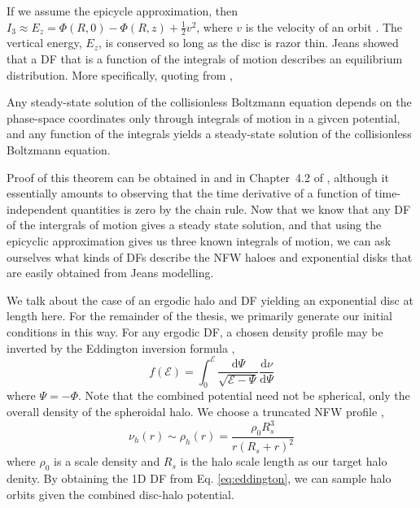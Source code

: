 If we assume the epicycle approximation, then $I_3 \approx E_z = \Phi(R,0) - \Phi(R,z) + \frac{1}{2} v^2$, where $v$ is the velocity of an orbit \citep{kd95galactics}. The vertical energy, $E_z$, is conserved so long as the disc is razor thin. Jeans showed that a DF that is a function of the integrals of motion describes an equilibrium distribution. More specifically, quoting from \citet{BT},
\begin{theorem}
Any steady-state solution of the collisionless Boltzmann equation depends on the phase-space coordinates only through integrals of motion in a givcen potential, and any function of the integrals yields a steady-state solution of the collisionless Boltzmann equation.
\end{theorem}
Proof of this theorem can be obtained in \citet{jeans_1915} and in Chapter~4.2 of \citet{BT}, although it essentially amounts to observing that the time derivative of a function of time-independent quantities is zero by the chain rule. Now that we know that any DF of the intergrals of motion gives a steady state solution, and that using the epicyclic approximation gives us three known integrals of motion, we can ask ourselves what kinds of DFs describe the NFW haloes and exponential disks that are easily obtained from Jeans modelling.

We talk about the case of an ergodic halo and DF yielding an exponential disc at length here. For the remainder of the thesis, we primarily generate our initial conditions in this way. For any ergodic DF, a chosen density profile may be inverted by the Eddington inversion formula \citep{BT},
\begin{equation}
f(\mathcal{E}) = \int_0^{\mathcal{E}} \frac{\text{d} \Psi}{\sqrt{\mathcal{E} - \Psi}} \frac{\text{d} \nu}{\text{d} \Psi} \label{eq:eddington}
\end{equation}
where $\Psi = - \Phi$. Note that the combined potential need not be spherical, only the overall density of the spheroidal halo. We choose a truncated NFW profile \citep{nfw},
\begin{equation}
\nu_h(r) \sim \rho_{h}(r) = \frac{\rho_0 R_s^3}{r (R_s + r)^2}
\end{equation}
where $\rho_0$ is a scale density and $R_s$ is the halo scale length as our target halo denity. By obtaining the 1D DF from Eq. \eqref{eq:eddington}, we can sample halo orbits given the combined disc-halo potential.

